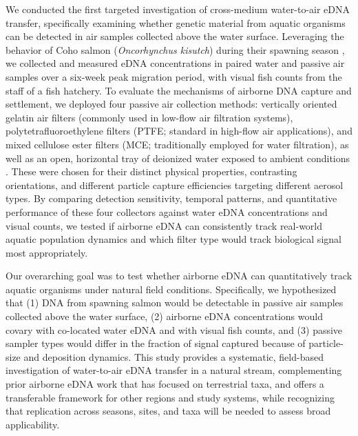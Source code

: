\documentclass{article}
\begin{document}
We conducted the first targeted investigation of cross-medium water-to-air eDNA transfer, specifically examining whether genetic material from aquatic organisms can be detected in air samples collected above the water surface. Leveraging the behavior of Coho salmon (\textit{Oncorhynchus kisutch}) during their spawning season \cite{mueller2008}, we collected and measured eDNA concentrations in paired water and passive air samples over a six-week peak migration period, with visual fish counts from the staff of a fish hatchery. To evaluate the mechanisms of airborne DNA capture and settlement, we deployed four passive air collection methods: vertically oriented gelatin air filters (commonly used in low-flow air filtration systems), polytetrafluoroethylene filters (PTFE; standard in high-flow air applications), and mixed cellulose ester filters (MCE; traditionally employed for water filtration), as well as an open, horizontal tray of deionized water exposed to ambient conditions \cite{klepke2022}. These were chosen for their distinct physical properties, contrasting orientations, and different particle capture efficiencies targeting different aerosol types. By comparing detection sensitivity, temporal patterns, and quantitative performance of these four collectors against water eDNA concentrations and visual counts, we tested if airborne eDNA can consistently track real-world aquatic population dynamics and which filter type would track biological signal most appropriately.

Our overarching goal was to test whether airborne eDNA can quantitatively track aquatic organisms under natural field conditions. Specifically, we hypothesized that (1) DNA from spawning salmon would be detectable in passive air samples collected above the water surface, (2) airborne eDNA concentrations would covary with co-located water eDNA and with visual fish counts, and (3) passive sampler types would differ in the fraction of signal captured because of particle-size and deposition dynamics. This study provides a systematic, field-based investigation of water-to-air eDNA transfer in a natural stream, complementing prior airborne eDNA work that has focused on terrestrial taxa, and offers a transferable framework for other regions and study systems, while recognizing that replication across seasons, sites, and taxa will be needed to assess broad applicability.
\end{document}

